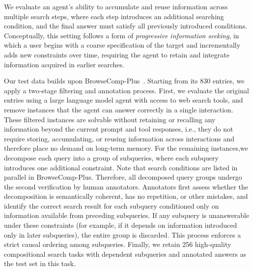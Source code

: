 We evaluate an agent’s ability to accumulate and reuse information across multiple search steps, where each step introduces an additional searching condition, and the final answer must satisfy all previously introduced conditions. Conceptually, this setting follows a form of \textit{progressive information seeking}, in which a user begins with a coarse specification of the target and incrementally adds new constraints over time, requiring the agent to retain and integrate information acquired in earlier searches.

Our test data builds upon BrowseComp-Plus~\citep{chen2025browsecomp}. Starting from its 830 entries, we apply a two-stage filtering and annotation process.
First, we evaluate the original entries using a large language model agent with access to web search tools, and remove instances that the agent can answer correctly in a single interaction. These filtered instances are solvable without retaining or recalling any information beyond the current prompt and tool responses, i.e., they do not require storing, accumulating, or reusing information across interactions and therefore place no demand on long-term memory.
For the remaining instances,we decompose each query into a group of subqueries, where each subquery introduces one additional constraint. Note that search conditions are listed in parallel in BrowseComp-Plus. 
Therefore, all decomposed query groups undergo the second verification by human annotators. Annotators first assess whether the decomposition is semantically coherent, has no repetition, or other mistakes, and identify the correct search result for each subquery conditioned only on information available from preceding subqueries. If any subquery is unanswerable under these constraints (for example, if it depends on information introduced only in later subqueries), the entire group is discarded.
This process enforces a strict causal ordering among subqueries.
Finally, we retain 256 high-quality compositional search tasks with dependent subqueries and annotated answers as the test set in this task.

\vspace{-5pt}
